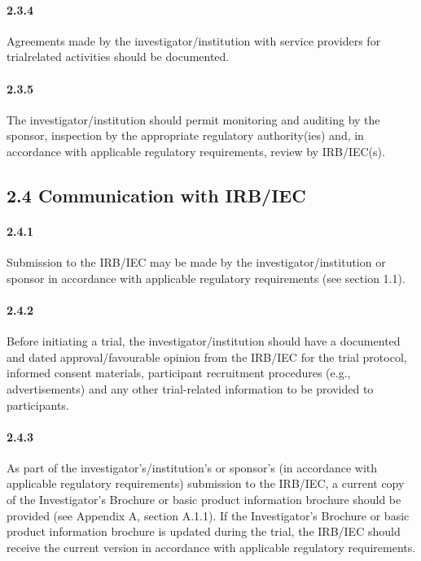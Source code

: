 \documentclass[11pt]{article}
\begin{document}
\paragraph{2.3.4} Agreements made by the investigator/institution with service providers for trialrelated activities should be documented.

\paragraph{2.3.5} The investigator/institution should permit monitoring and auditing by the sponsor, inspection by the appropriate regulatory authority(ies) and, in accordance with applicable regulatory requirements, review by IRB/IEC(s).

\subsection{2.4 Communication with IRB/IEC}

\paragraph{2.4.1} Submission to the IRB/IEC may be made by the investigator/institution or sponsor in accordance with applicable regulatory requirements (see section 1.1).

\paragraph{2.4.2} Before initiating a trial, the investigator/institution should have a documented and dated approval/favourable opinion from the IRB/IEC for the trial protocol, informed consent materials, participant recruitment procedures (e.g., advertisements) and any other trial-related information to be provided to participants.

\paragraph{2.4.3} As part of the investigator's/institution's or sponsor's (in accordance with applicable regulatory requirements) submission to the IRB/IEC, a current copy of the Investigator's Brochure or basic product information brochure should be provided (see Appendix A, section A.1.1). If the Investigator's Brochure or basic product information brochure is updated during the trial, the IRB/IEC should receive the current version in accordance with applicable regulatory requirements.
\end{document}
